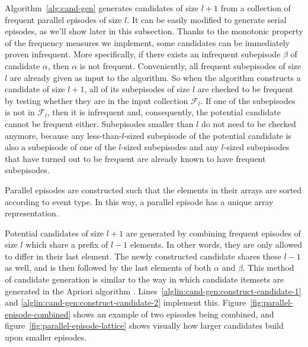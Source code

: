 Algorithm~\ref{alg:cand-gen} generates candidates of size $ l + 1 $ from a collection of frequent parallel episodes of size $ l $. It can be easily modified to generate serial episodes, as we'll show later in this subsection. Thanks to the monotonic property of the frequency measures we implement, some candidates can be immediately proven infrequent. More specifically, if there exists an infrequent subepisode $ \beta $ of candidate $ \alpha $, then $ \alpha $ is not frequent.
Conveniently, all frequent subepisodes of size $ l $ are already given as input to the algorithm. So when the algorithm constructs a candidate of size $ l + 1 $, all of its subepisodes of size $ l $ are checked to be frequent by testing whether they are in the input collection $ \mathcal{F}_l $. If one of the subepisodes is not in $ \mathcal{F}_l $, then it is infrequent and, consequently, the potential candidate cannot be frequent either.
Subepisodes smaller than $ l $ do not need to be checked anymore, because any less-than-$ l $-sized subepisode of the potential candidate is also a subepisode of one of the $ l $-sized subepisodes and any $ l $-sized subepisodes that have turned out to be frequent are already known to have frequent subepisodes.

Parallel episodes are constructed such that the elements in their arrays are sorted according to event type. In this way, a parallel episode has a unique array representation.

Potential candidates of size $ l + 1 $ are generated by combining frequent episodes of size $ l $ which share a prefix of $ l - 1 $ elements. In other words, they are only allowed to differ in their last element. The newly constructed candidate shares these $ l - 1 $ as well, and is then followed by the last elements of both $ \alpha $ and $ \beta $. This method of candidate generation is similar to the way in which candidate itemsets are generated in the Apriori algorithm \citep{mannila1997discovery}. Lines~\ref{alglin:cand-gen:construct-candidate-1} and \ref{alglin:cand-gen:construct-candidate-2} implement this. Figure~\ref{fig:parallel-episode-combined} shows an example of two episodes being combined, and figure~\ref{fig:parallel-episode-lattice} shows visually how larger candidates build upon smaller episodes.

